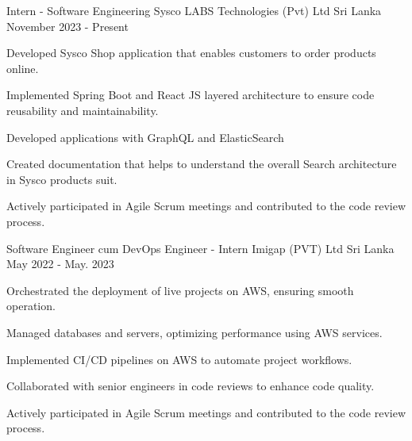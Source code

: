 

\begin{cventries}

  \cventry
  {Intern - Software Engineering} %
  {Sysco LABS Technologies (Pvt) Ltd} %
  {Sri Lanka} %
  {November 2023 - Present} %
  {
    \begin{cvitems} %
      \item {Developed Sysco Shop application that enables customers to order products online.}
      \item {Implemented Spring Boot and React JS layered architecture to ensure code reusability and maintainability.}
      \item {Developed applications with GraphQL and ElasticSearch}
      \item {Created documentation that helps to understand the overall Search architecture in Sysco products suit.}
      \item {Actively participated in Agile Scrum meetings and contributed to the code review process.}
    \end{cvitems}
  }

  \cventry
  {Software Engineer cum DevOps Engineer - Intern} %
  {Imigap (PVT) Ltd} %
  {Sri Lanka} %
  {May 2022 - May. 2023} %
  {
    \begin{cvitems} %
      \item {Orchestrated the deployment of live projects on AWS, ensuring smooth operation.}
      \item {Managed databases and servers, optimizing performance using AWS services.}
      \item {Implemented CI/CD pipelines on AWS to automate project workflows.}
      \item {Collaborated with senior engineers in code reviews to enhance code quality.}
      \item {Actively participated in Agile Scrum meetings and contributed to the code review process.}
    \end{cvitems}
  }


\end{cventries}
